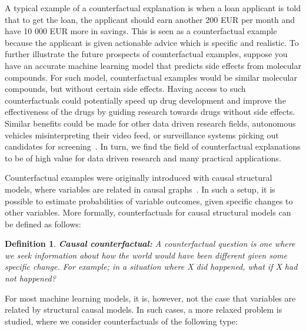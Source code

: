\documentclass[11pt,a4paper,twoside,openright,final]{memoir}
\newtheorem{definition}{Definition}
\begin{document}
A typical example of a counterfactual explanation is when a loan applicant is told that to get the loan, the applicant should earn another 200 EUR per month and have 10 000 EUR more in savings.
This is seen as a counterfactual example because the applicant is given actionable advice which is specific and realistic.
To further illustrate the future prospects of counterfactual examples, suppose you have an accurate machine learning model that predicts side effects from molecular compounds.
For such model, counterfactual examples would be similar molecular compounds, but without certain side effects.
Having access to such counterfactuals could potentially speed up drug development and improve the effectiveness of the drugs by guiding research towards drugs without side effects.
Similar benefits could be made for other data driven research fields, autonomous vehicles misinterpreting their video feed, or surveillance systems picking out candidates for screening~\cite{goyal19a}. 
In turn, we find the field of counterfactual explanations to be of high value for data driven research and many practical applications. 

Counterfactual examples were originally introduced with causal structural models, where variables are related in causal graphs~\cite{todo}.
In such a setup, it is possible to estimate probabilities of variable outcomes, given specific changes to other variables.
More formally, counterfactuals for causal structural models can be defined as follows:

\begin{definition}\label{def:causal-counterfactual}
\textbf{Causal counterfactual:} A counterfactual question is one where we seek
information about how the world would have been different given
some specific change. For example; in a situation where X \emph{did}
happened, what if X had \emph{not} happened? 
\end{definition}

For most machine learning models, it is, however, not the case that variables are related by structural causal models.
In such cases, a more relaxed problem is studied, where we consider counterfactuals of the following type: 
\end{document}

